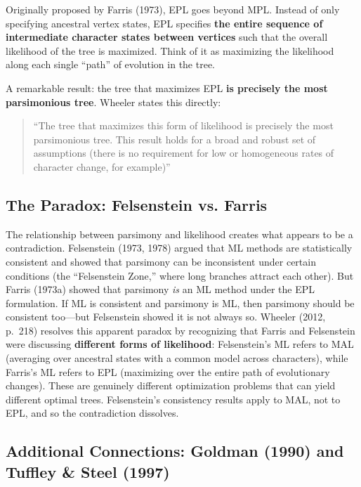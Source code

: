 Originally proposed by Farris (1973), EPL goes beyond MPL. Instead of only specifying ancestral vertex states, EPL specifies \textbf{the entire sequence of intermediate character states between vertices} such that the overall likelihood of the tree is maximized. Think of it as maximizing the likelihood along each single ``path'' of evolution in the tree.

A remarkable result: the tree that maximizes EPL \textbf{is precisely the most parsimonious tree}. Wheeler states this directly:

\begin{quote}
``The tree that maximizes this form of likelihood is precisely the most parsimonious tree. This result holds for a broad and robust set of assumptions (there is no requirement for low or homogeneous rates of character change, for example)'' \parencite{wheeler2012}
\end{quote}

\subsection{The Paradox: Felsenstein vs. Farris}

The relationship between parsimony and likelihood creates what appears to be a contradiction. Felsenstein (1973, 1978) argued that ML methods are statistically consistent and showed that parsimony can be inconsistent under certain conditions (the ``Felsenstein Zone,'' where long branches attract each other). But Farris (1973a) showed that parsimony \textit{is} an ML method under the EPL formulation. If ML is consistent and parsimony is ML, then parsimony should be consistent too---but Felsenstein showed it is not always so. Wheeler (2012, p.~218) resolves this apparent paradox by recognizing that Farris and Felsenstein were discussing \textbf{different forms of likelihood}: Felsenstein's ML refers to MAL (averaging over ancestral states with a common model across characters), while Farris's ML refers to EPL (maximizing over the entire path of evolutionary changes). These are genuinely different optimization problems that can yield different optimal trees. Felsenstein's consistency results apply to MAL, not to EPL, and so the contradiction dissolves.

\subsection{Additional Connections: Goldman (1990) and Tuffley \& Steel (1997)}

